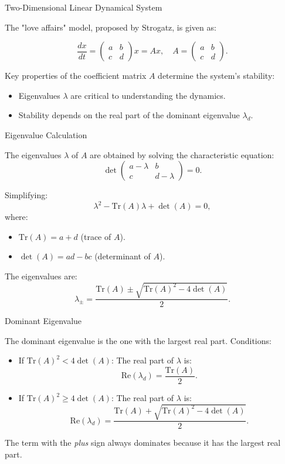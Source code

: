 \documentclass{beamer}
\begin{document}
\begin{frame}{Two-Dimensional Linear Dynamical System}

The "love affairs" model, proposed by Strogatz, is given as:

\[
\frac{dx}{dt} = 
\begin{pmatrix}
a & b \\
c & d
\end{pmatrix} x = A x, \quad A = 
\begin{pmatrix}
a & b \\
c & d
\end{pmatrix}.
\]

Key properties of the coefficient matrix \( A \) determine the system's stability:
\begin{itemize}
    \item Eigenvalues \( \lambda \) are critical to understanding the dynamics.
    \item Stability depends on the real part of the dominant eigenvalue \( \lambda_d \).
\end{itemize}

\end{frame}

\begin{frame}{Eigenvalue Calculation}

The eigenvalues \( \lambda \) of \( A \) are obtained by solving the characteristic equation:
\[
\det \begin{pmatrix}
a - \lambda & b \\
c & d - \lambda
\end{pmatrix} = 0.
\]

Simplifying:
\[
\lambda^2 - \mathrm{Tr}(A) \lambda + \det(A) = 0,
\]
where:
\begin{itemize}
    \item \( \mathrm{Tr}(A) = a + d \) (trace of \( A \)).
    \item \( \det(A) = ad - bc \) (determinant of \( A \)).
\end{itemize}

The eigenvalues are:
\[
\lambda_{\pm} = \frac{\mathrm{Tr}(A) \pm \sqrt{\mathrm{Tr}(A)^2 - 4 \det(A)}}{2}.
\]

\end{frame}

\begin{frame}{Dominant Eigenvalue}

The dominant eigenvalue is the one with the largest real part. Conditions:

\begin{itemize}
    \item If \( \mathrm{Tr}(A)^2 < 4 \det(A) \): The real part of \( \lambda \) is:
    \[
    \mathrm{Re}(\lambda_d) = \frac{\mathrm{Tr}(A)}{2}.
    \]
    \item If \( \mathrm{Tr}(A)^2 \geq 4 \det(A) \): The real part of \( \lambda \) is:
    \[
    \mathrm{Re}(\lambda_d) = \frac{\mathrm{Tr}(A) + \sqrt{\mathrm{Tr}(A)^2 - 4 \det(A)}}{2}.
    \]
\end{itemize}

The term with the \emph{plus} sign always dominates because it has the largest real part.

\end{frame}
\end{document}
